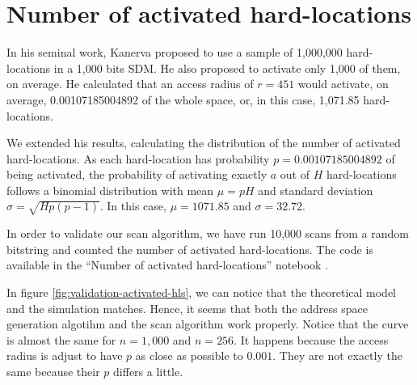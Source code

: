 \section{Number of activated hard-locations}

In his seminal work, Kanerva proposed to use a sample of 1,000,000 hard-locations in a 1,000 bits SDM. He also proposed to activate only 1,000 of them, on average. He calculated that an access radius of $r=451$ would activate, on average, 0.00107185004892 of the whole space, or, in this case, 1,071.85 hard-locations.

We extended his results, calculating the distribution of the number of activated hard-locations. As each hard-location has probability $p=0.00107185004892$ of being activated, the probability of activating exactly $a$ out of $H$ hard-locations follows a binomial distribution with mean $\mu = pH$ and standard deviation $\sigma = \sqrt{Hp(p-1)}$. In this case, $\mu = 1071.85$ and $\sigma = 32.72$.

In order to validate our scan algorithm, we have run 10,000 scans from a random bitstring and counted the number of activated hard-locations. The code is available in the ``Number of activated hard-locations'' notebook \citep{sdmframework}.

In figure \ref{fig:validation-activated-hls}, we can notice that the theoretical model and the simulation matches. Hence, it seems that both the address space generation algotihm and the scan algorithm work properly. Notice that the curve is almost the same for $n=1,000$ and $n=256$. It happens because the access radius is adjust to have $p$ as close as possible to $0.001$. They are not exactly the same because their $p$ differs a little.

